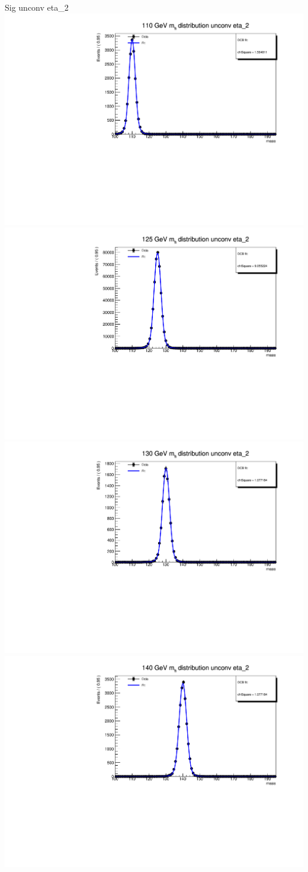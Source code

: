 \documentclass[10pt,UKenglish, leqno, xcolor = dvipsnames]{beamer}
\begin{document}
		\begin{frame}{Sig unconv eta\_2}
			\vfill
			\centering
			\includegraphics[width=.45\textwidth]{../images/week_10/PowhegPy8_NNLOPS_ggH110_unconv_eta_2_fit.pdf}
			\includegraphics[width=.45\textwidth]{../images/week_10/PowhegPy8_NNLOPS_ggH125_unconv_eta_2_fit.pdf}\\
			\includegraphics[width=.45\textwidth]{../images/week_10/PowhegPy8_NNLOPS_ggH130_unconv_eta_2_fit.pdf}
			\includegraphics[width=.45\textwidth]{../images/week_10/PowhegPy8_NNLOPS_ggH140_unconv_eta_2_fit.pdf}
			\vfill
		\end{frame}
	
\end{document}
